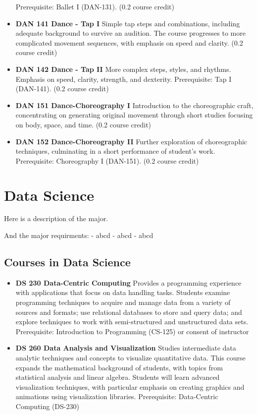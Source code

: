 \documentclass[
  letterpaper,
]{scrbook}
\providecommand{\tightlist}{%
  \setlength{\itemsep}{0pt}\setlength{\parskip}{0pt}}
\begin{document}
\begin{itemize}
  Prerequisite: Ballet I (DAN-131). (0.2 course credit)
\item
  \textbf{DAN 141 Dance - Tap I} Simple tap steps and combinations,
  including adequate background to survive an audition. The course
  progresses to more complicated movement sequences, with emphasis on
  speed and clarity. (0.2 course credit)
\item
  \textbf{DAN 142 Dance - Tap II} More complex steps, styles, and
  rhythms. Emphasis on speed, clarity, strength, and dexterity.
  Prerequisite: Tap I (DAN-141). (0.2 course credit)
\item
  \textbf{DAN 151 Dance-Choreography I} Introduction to the
  choreographic craft, concentrating on generating original movement
  through short studies focusing on body, space, and time. (0.2 course
  credit)
\item
  \textbf{DAN 152 Dance-Choreography II} Further exploration of
  choreographic techniques, culminating in a short performance of
  student's work. Prerequisite: Choreography I (DAN-151). (0.2 course
  credit)
\end{itemize}

\section{Data Science}\label{data-science}

Here is a description of the major.

And the major requirments: - abcd - abcd - abcd

\subsection{Courses in Data Science}\label{courses-in-data-science}

\begin{itemize}
\tightlist
\item
  \textbf{DS 230 Data-Centric Computing} Provides a programming
  experience with applications that focus on data handling tasks.
  Students examine programming techniques to acquire and manage data
  from a variety of sources and formats; use relational databases to
  store and query data; and explore techniques to work with
  semi-structured and unstructured data sets. Prerequisite: Introduction
  to Programming (CS-125) or consent of instructor\\
\item
  \textbf{DS 260 Data Analysis and Visualization} Studies intermediate
  data analytic techniques and concepts to visualize quantitative data.
  This course expands the mathematical background of students, with
  topics from statistical analysis and linear algebra. Students will
  learn advanced visualization techniques, with particular emphasis on
  creating graphics and animations using visualization libraries.
  Prerequisite: Data-Centric Computing (DS-230)
\end{itemize}
\end{document}
